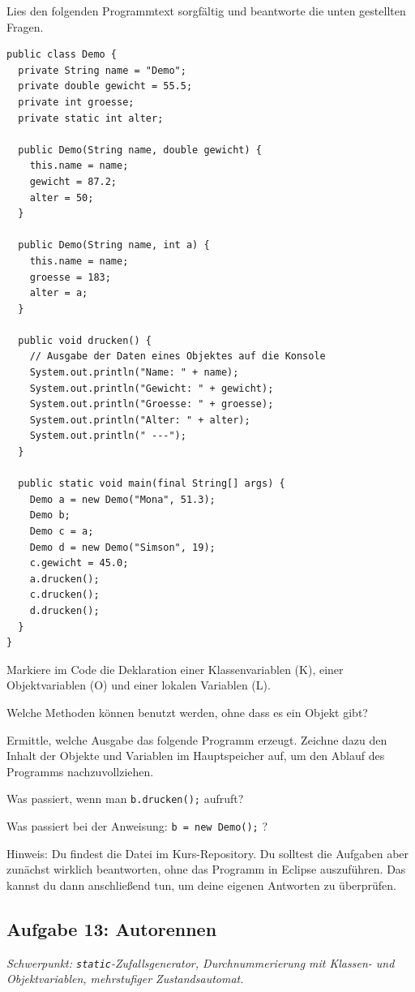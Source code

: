 Lies den folgenden Programmtext sorgfältig und beantworte die unten gestellten
Fragen.

\begin{lstlisting}
public class Demo {
  private String name = "Demo";
  private double gewicht = 55.5;
  private int groesse;
  private static int alter;

  public Demo(String name, double gewicht) {
    this.name = name;
    gewicht = 87.2;
    alter = 50;
  }

  public Demo(String name, int a) {
    this.name = name;
    groesse = 183;
    alter = a;
  }

  public void drucken() {
    // Ausgabe der Daten eines Objektes auf die Konsole
    System.out.println("Name: " + name);
    System.out.println("Gewicht: " + gewicht);
    System.out.println("Groesse: " + groesse);
    System.out.println("Alter: " + alter);
    System.out.println(" ---");
  }

  public static void main(final String[] args) {
    Demo a = new Demo("Mona", 51.3);
    Demo b;
    Demo c = a;
    Demo d = new Demo("Simson", 19);
    c.gewicht = 45.0;
    a.drucken();
    c.drucken();
    d.drucken();
  }
}
\end{lstlisting}

\begin{compactenum}[a)]
\item Markiere im Code die Deklaration einer Klassenvariablen (K), einer
Objektvariablen (O) und einer lokalen Variablen (L).
\item Welche Methoden können benutzt werden, ohne dass es ein Objekt gibt?
\item Ermittle, welche Ausgabe das folgende Programm erzeugt. Zeichne dazu den
Inhalt der Objekte und Variablen im Hauptspeicher auf, um den Ablauf des
Programms nachzuvollziehen.
\item Was passiert, wenn man \lstinline|b.drucken();| aufruft?
\item Was passiert bei der Anweisung: \lstinline|b = new Demo();| ?
\end{compactenum}

Hinweis: Du findest die Datei  im Kurs-Repository. Du solltest
die Aufgaben aber zunächst wirklich beantworten, ohne das Programm in Eclipse
auszuführen. Das kannst du dann anschließend tun, um deine eigenen Antworten zu
überprüfen.


\subsection{Aufgabe 13: Autorennen \tagLK}
\noindent \emph{Schwerpunkt: \texttt{static}-Zufallsgenerator, Durchnummerierung mit Klassen- und Objektvariablen, mehrstufiger Zustandsautomat.}

